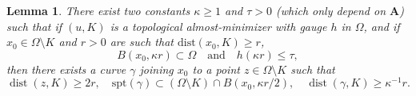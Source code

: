 \documentclass[12pt]{article}
\newtheorem{lemma}[theorem]{Lemma}
\theoremstyle{definition}
\theoremstyle{remark}
\numberwithin{equation}{section}
\DeclareMathOperator{\dist}{dist}
\newcommand{\A}{\mathbf{A}}
\newcommand{\spt}{\mathrm{spt}}
\begin{document}
\begin{lemma}
    \label{LemmaCurvaPreliminareLoc}
    There exist two constants $\kappa \geq 1$ and $\tau>0$ (which only depend on $\A$) such that if $(u,K)$ is a
    topological almost-minimizer with gauge $h$ in $\Omega$, and if $x_0\in\Omega\setminus K$ and $r > 0$ are such
    that $\mathrm{dist}(x_0,K) \geq r$,
    \begin{equation}
        B(x_0,\kappa r)\subset\Omega\quad \text{and} \quad h(\kappa r) \leq \tau,
    \end{equation}
    then there exists a curve $\gamma$ joining $x_0$ to a point $z \in \Omega \setminus K$ such that 
    \begin{equation}\label{eq_curve}
        \dist(z,K)\geq 2r,\quad \spt(\gamma) \subset(\Omega\setminus K)\cap B(x_0,\kappa r/2),\quad \dist(\gamma,K)\geq \kappa^{-1}r.
    \end{equation}
\end{lemma}
\end{document}
